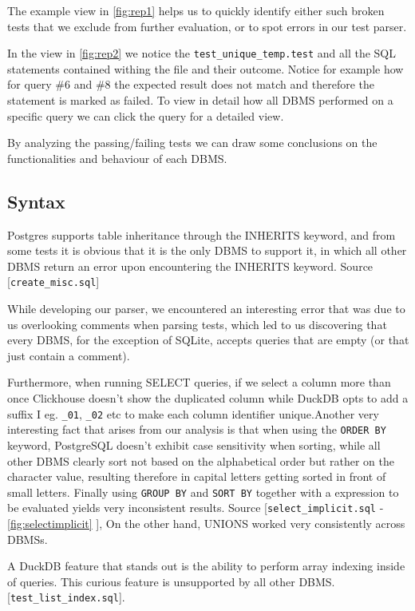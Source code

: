 \documentclass[acmsmall,nonacm]{acmart}
\begin{document}
The example view in \autoref{fig:rep1} helps us to quickly identify either such broken tests that we exclude from further evaluation, or to spot errors in our test parser.

In the view in \autoref{fig:rep2} we notice the \texttt{test\_unique\_temp.test} and all the SQL statements contained withing the file and their outcome. Notice for example how for query \#6 and \#8 the expected result does not match and therefore the statement is marked as failed. To view in detail how all DBMS performed on a specific query we can click the query for a detailed view.


By analyzing the passing/failing tests we can draw some conclusions on the functionalities and behaviour of each DBMS.

\subsection{Syntax}
Postgres supports table inheritance through the INHERITS keyword, and from some tests it is obvious that it is the only DBMS to support it, in which all other DBMS return an error upon encountering the INHERITS keyword. Source [\texttt{create\_misc.sql}]

While developing our parser, we encountered an interesting error that was due to us overlooking comments when parsing tests, which led to us discovering that every DBMS, for the exception of SQLite, accepts queries that are empty (or that just contain a comment). 

Furthermore, when running SELECT queries, if we select a column more than once Clickhouse doesn't show the duplicated column while DuckDB opts to add a suffix I eg. \texttt{\_01}, \texttt{\_02} etc to make each column identifier unique.Another  very interesting fact that arises from our analysis is that when using the \texttt{ORDER BY} keyword, PostgreSQL doesn't exhibit case sensitivity when sorting, while all other DBMS clearly sort not based on the alphabetical order but rather on the character value, resulting therefore in capital letters getting sorted in front of small letters. Finally using \texttt{GROUP BY} and \texttt{SORT BY} together with a expression to be evaluated yields very inconsistent results. Source [\texttt{select\_implicit.sql} - \autoref{fig:selectimplicit} ], On the other hand, UNIONS worked very consistently across DBMSs. 

A DuckDB feature that stands out is the ability to perform array indexing inside of queries. This curious feature is unsupported by all other DBMS. [\texttt{test\_list\_index.sql}].
\end{document}
